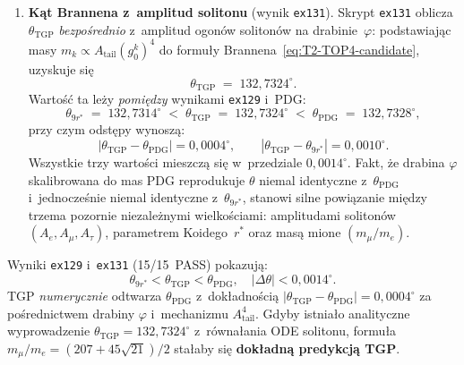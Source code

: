 \begin{enumerate}
  \item \textbf{K\k{a}t Brannena z~amplitud solitonu} (wynik \texttt{ex131}).
    \label{it:T2-theta-tgp}
    Skrypt \texttt{ex131} oblicza $\theta_{\mathrm{TGP}}$
    \emph{bezpo\'srednio} z~amplitud ogon\'ow soliton\'ow
    na drabinie~$\varphi$: podstawiaj\k{a}c masy
    $m_k \propto A_{\mathrm{tail}}(g_0^k)^4$ do
    formu\l{}y Brannena~\eqref{eq:T2-TOP4-candidate},
    uzyskuje si\k{e}
    \begin{equation}\label{eq:T2-theta-tgp}
      \theta_{\mathrm{TGP}} \;=\; 132{,}7324^\circ.
    \end{equation}
    Warto\'s\'c ta le\.zy \emph{pomi\k{e}dzy} wynikami \texttt{ex129} i~PDG:
    \begin{equation}\label{eq:T2-theta-ordering}
      \theta_{9r^*} \;=\; 132{,}7314^\circ
      \;<\; \theta_{\mathrm{TGP}} \;=\; 132{,}7324^\circ
      \;<\; \theta_{\mathrm{PDG}} \;=\; 132{,}7328^\circ,
    \end{equation}
    przy czym odst\k{e}py wynosz\k{a}:
    \[
      |\theta_{\mathrm{TGP}} - \theta_{\mathrm{PDG}}| = 0{,}0004^\circ,
      \qquad
      |\theta_{\mathrm{TGP}} - \theta_{9r^*}| = 0{,}0010^\circ.
    \]
    Wszystkie trzy warto\'sci mieszcz\k{a} si\k{e} w~przedziale
    $0{,}0014^\circ$.
    Fakt, \.ze drabina $\varphi$ skalibrowana do mas PDG
    reprodukuje $\theta$ niemal identyczne z~$\theta_{\mathrm{PDG}}$
    i~jednocze\'snie niemal identyczne z~$\theta_{9r^*}$,
    stanowi silne powi\k{a}zanie mi\k{e}dzy trzema pozornie
    niezale\.znymi wielko\'sciami:
    amplitudami soliton\'ow $(A_e, A_\mu, A_\tau)$,
    parametrem Koidego~$r^*$
    oraz mas\k{a} mione $(m_\mu/m_e)$.
\end{enumerate}

\begin{observation}\label{obs:T2-top4-closure}
  Wyniki \texttt{ex129} i~\texttt{ex131} (15/15~PASS) pokazuj\k{a}:
  \begin{equation}
    \theta_{9r^*} < \theta_{\mathrm{TGP}} < \theta_{\mathrm{PDG}},
    \quad
    |\Delta\theta| < 0{,}0014^\circ.
  \end{equation}
  TGP \emph{numerycznie} odtwarza $\theta_{\mathrm{PDG}}$
  z~dok\l{}adno\'sci\k{a} $|\theta_{\mathrm{TGP}}-\theta_{\mathrm{PDG}}|=0{,}0004^\circ$
  za po\'srednictwem drabiny $\varphi$ i~mechanizmu $A_{\mathrm{tail}}^4$.
  Gdyby istnia\l{}o analityczne wyprowadzenie
  $\theta_{\mathrm{TGP}} = 132{,}7324^\circ$
  z~r\'owna\l{}ania ODE solitonu,
  formu\l{}a $m_\mu/m_e = (207+45\sqrt{21})/2$
  sta\l{}aby si\k{e} \textbf{dok\l{}adn\k{a} predykcj\k{a} TGP}.
\end{observation}

